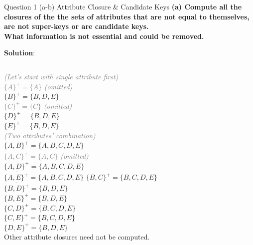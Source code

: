 \begin{frame}[fragile]{Question 1 (a-b) Attribute Closure \& Candidate Keys}
\textbf{(a) Compute all the closures of the the sets of attributes that are not equal to themselves, are not super-keys or are candidate keys.} \\
\textbf{What information is not essential and could be removed.}\vspace{15pt}

\textbf{Solution}: \vspace{3pt}

\begin{columns}[t]
	\textcolor{gray}{\scriptsize \textit{(Let's start with single attribute first)}}\\
	\textcolor{gray}{$\{A\}^{+}= \{A\}$ \scriptsize \textit{(omitted)}}\\	
	$\{B\}^{+}= \{B, D, E\}$\\	
	\textcolor{gray}{$\{C\}^{+}= \{C\}$ \scriptsize \textit{(omitted)}}\\
	$\{D\}^{+}= \{B, D, E\}$\\
	$\{E\}^{+}= \{B, D, E\}$\\ \vspace{5pt}
	\textcolor{gray}{\textit{\scriptsize (Two attributes' combination)}}\\
	$\underline{\{A, B\}^{+}}= \{A, B, C, D, E\}$\\
	\textcolor{gray}{$\{A, C\}^{+}= \{A, C\}$ \scriptsize \textit{(omitted)}}\\
	$\underline{\{A, D\}^{+}}= \{A, B, C, D, E\}$\\
	$\underline{\{A, E\}^{+}}= \{A, B, C, D, E\}$
	$\{B, C\}^{+}= \{B, C, D, E\}$\\
	$\{B, D\}^{+}= \{B, D, E\}$\\
	$\{B, E\}^{+}= \{B, D, E\}$\\
	$\{C, D\}^{+}= \{B, C, D, E\}$\\
	$\{C, E\}^{+}= \{B, C, D, E\}$\\
	$\{D, E\}^{+}= \{B, D, E\}$\\
	 \vspace{5pt}
	Other attribute closures need not be computed.
\end{columns}
\end{frame}

